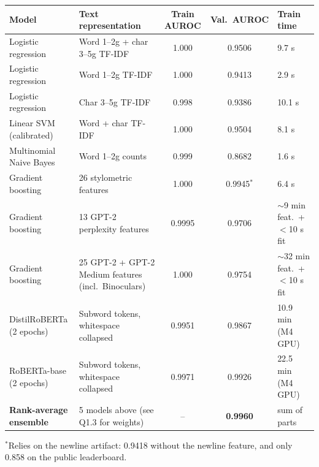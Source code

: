 \begin{center}
\footnotesize
\begin{tabular}{|p{3.0cm}|p{4.2cm}|c|c|p{2.5cm}|}
\hline
\textbf{Model} & \textbf{Text representation} & \textbf{Train AUROC} & \textbf{Val.\ AUROC} & \textbf{Train time} \\
\hline
Logistic regression & Word 1--2g + char 3--5g TF-IDF & 1.000 & 0.9506 & 9.7 s \\
Logistic regression & Word 1--2g TF-IDF & 1.000 & 0.9413 & 2.9 s \\
Logistic regression & Char 3--5g TF-IDF & 0.998 & 0.9386 & 10.1 s \\
Linear SVM (calibrated) & Word + char TF-IDF & 1.000 & 0.9504 & 8.1 s \\
Multinomial Naive Bayes & Word 1--2g counts & 0.999 & 0.8682 & 1.6 s \\
Gradient boosting & 26 stylometric features & 1.000 & 0.9945$^{*}$ & 6.4 s \\
Gradient boosting & 13 GPT-2 perplexity features & 0.9995 & 0.9706 & $\sim$9 min feat.\ + $<$10 s fit \\
Gradient boosting & 25 GPT-2 + GPT-2 Medium features (incl.\ Binoculars) & 1.000 & 0.9754 & $\sim$32 min feat.\ + $<$10 s fit \\
DistilRoBERTa (2 epochs) & Subword tokens, whitespace collapsed & 0.9951 & 0.9867 & 10.9 min (M4 GPU) \\
RoBERTa-base (2 epochs) & Subword tokens, whitespace collapsed & 0.9971 & 0.9926 & 22.5 min (M4 GPU) \\
\textbf{Rank-average ensemble} & 5 models above (see Q1.3 for weights) & -- & \textbf{0.9960} & sum of parts \\
\hline
\end{tabular}
\end{center}
{\footnotesize $^{*}$Relies on the newline artifact: 0.9418 without the newline
feature, and only 0.858 on the public leaderboard.}


